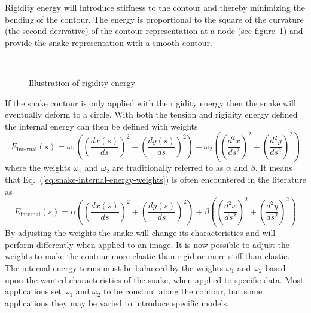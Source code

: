 Rigidity energy will introduce stiffness to the contour and thereby
minimizing the bending of the contour. The energy is proportional to
the square of the curvature (the second derivative) of the contour
representation at a node (see
figure~\ref{fig:internal-energy-rigidity}) and provide the snake
representation with a smooth contour.
\begin{figure}[htpb]
  \centering
  \mbox{%
    \quad%
    \quad%
    }
  \caption{Illustration of rigidity energy}
  \label{fig:internal-energy-rigidity}
\end{figure}
If the snake contour is only applied with the rigidity energy then the
snake will eventually deform to a circle. With both the tension and
rigidity energy defined the internal energy can then be defined with
weights
\begin{equation}
  \label{eq:snake-internal-energy-weights}
  E_{\text{internal}}(s) =
  \omega_{1}\left(\left(\frac{dx(s)}{ds}\right)^2+\left(\frac{dy(s)}{ds}\right)^2\right)
  + \omega_{2}\left(\left(\frac{d^2x}{ds^2}\right)^2+\left(\frac{d^2y}{ds^2}\right)^2\right)
\end{equation}
where the weights $\omega_{1}$ and $\omega_{2}$ are traditionally
referred to as $\alpha$ and $\beta$. It means that
Eq.~(\ref{eq:snake-internal-energy-weights}) is often encountered in
the literature as
\begin{equation}
  \nonumber
  E_{\text{internal}}(s) = \alpha\left(\left(\frac{dx(s)}{ds}\right)^2+\left(\frac{dy(s)}{ds}\right)^2\right) + \beta\left(\left(\frac{d^2x}{ds^2}\right)^2+\left(\frac{d^2y}{ds^2}\right)^2\right)
\end{equation}
By adjusting the weights the snake will change its characteristics and
will perform differently when applied to an image. It is now possible
to adjust the weights to make the contour more elastic than rigid or
more stiff than elastic.  The internal energy terms must be balanced
by the weights $\omega_1$ and $\omega_2$ based upon the wanted
characteristics of the snake, when applied to specific data. Most
applications set $\omega_1$ and $\omega_2$ to be constant along the
contour, but some applications they may be varied to introduce
specific models.

